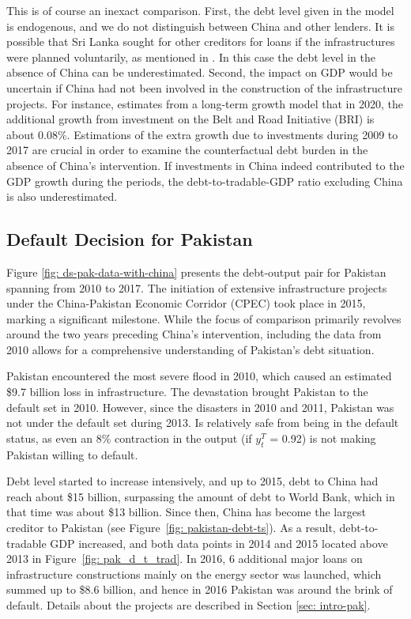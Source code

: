 This is of course an inexact comparison.
First, the debt level given in the model is endogenous, and we do not distinguish between China and other lenders. It is possible that Sri Lanka sought for other creditors for loans if the infrastructures were planned voluntarily, as mentioned in \citet{Brautigam-meme-2020}. In this case the debt level in the absence of China can be underestimated.
Second, the impact on GDP would be uncertain if China had not been involved in the construction of the infrastructure projects. For instance, \citet{Bandiera-Vasileios-BRI-debt} estimates from a long-term growth model that in 2020, the additional growth from investment on the Belt and Road Initiative (BRI) is about 0.08\%.
Estimations of the extra growth due to investments during 2009 to 2017 are crucial in order to examine the counterfactual debt burden in the absence of China's intervention. If investments in China indeed contributed to the GDP growth during the periods, the debt-to-tradable-GDP ratio excluding China is also underestimated.

\subsection{Default Decision for Pakistan}

Figure \ref{fig: ds-pak-data-with-china} presents the debt-output pair for Pakistan spanning from 2010 to 2017. The initiation of extensive infrastructure projects under the China-Pakistan Economic Corridor (CPEC) took place in 2015, marking a significant milestone. While the focus of comparison primarily revolves around the two years preceding China's intervention, including the data from 2010 allows for a comprehensive understanding of Pakistan's debt situation.

Pakistan encountered the most severe flood in 2010, which caused an estimated \$9.7 billion loss in infrastructure. The devastation brought Pakistan to the default set in 2010.
However, since the disasters in 2010 and 2011, Pakistan was not under the default set during 2013. Is relatively safe from being in the default status, as even an 8\% contraction in the output (if $y^T_t$ = 0.92) is not making Pakistan willing to default.

Debt level started to increase intensively, and up to 2015, debt to China had reach about \$15 billion, surpassing the amount of debt to World Bank, which in that time was about \$13 billion. Since then, China has become the largest creditor to Pakistan (see Figure~\ref{fig: pakistan-debt-ts}). As a result, debt-to-tradable GDP increased, and both data points in 2014 and 2015 located above 2013 in Figure~\ref{fig: pak_d_t_trad}. In 2016, 6 additional major loans on infrastructure constructions mainly on the energy sector was launched, which summed up to \$8.6 billion, and hence in 2016 Pakistan was around the brink of default. Details about the projects are described in Section \ref{sec: intro-pak}.

